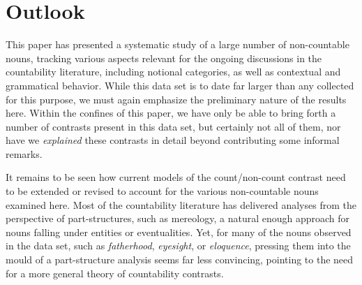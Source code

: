 \documentclass[output=paper]{langscibook}
\begin{document}






\section{Outlook} \label{gri-ric:sec:outlook}

This paper has presented a systematic study of a large number of non-countable nouns, tracking various aspects relevant for the ongoing discussions in the countability literature, including notional categories, as well as contextual and grammatical behavior.  While this data set is to date far larger than any collected for this purpose, we must again emphasize the preliminary nature of the results here. Within the confines of this paper, we have only be able to bring forth a number of contrasts present in this data set, but certainly not all of them, nor have we \textit{explained} these contrasts in detail beyond contributing some informal remarks.  


It remains to be seen how current models of the count/non-count contrast need to be extended or revised to account for the various non-countable nouns examined here.  Most of the countability literature has delivered analyses from the perspective of part-structures, such as mereology, a natural enough approach for nouns falling under entities or eventualities.  Yet, for many of the nouns observed in the data set, such as \textit{fatherhood}, \textit{eyesight}, or \textit{eloquence}, pressing them into the mould of a part-structure analysis seems far less convincing, pointing to the need for a more general theory of countability contrasts.  










\end{document}
